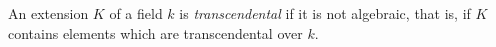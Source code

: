 An extension $K$ of a field $k$ is \textit{transcendental} if it is not algebraic, that is, if $K$ contains elements which are transcendental over $k$.
